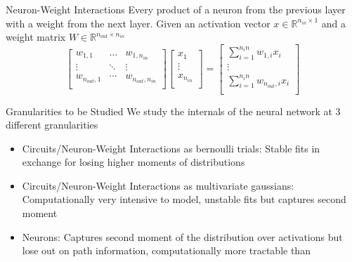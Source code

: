 \documentclass{beamer}
\begin{document}
    \begin{frame}{Neuron-Weight Interactions}
        Every product of a neuron from the previous layer with a weight from the next layer. 
        Given an activation vector $x \in \mathbb{R}^{n_{in} \times 1}$ and a weight matrix $W \in \mathbb{R}^{n_{out} \times n_{in}}$ 
        \[
            \begin{bmatrix}
                w_{1,1} & \dots & w_{1,n_{in}} \\
                \vdots & \ddots & \vdots \\
                w_{n_{out}, 1} & \cdots & w_{n_{out}, n_{in}} \\
            \end{bmatrix}
            \begin{bmatrix}
                x_1 \\
                \vdots \\
                x_{n_{in}} \\
            \end{bmatrix}
            = 
            \begin{bmatrix}
                \sum_{i=1}^{n_in} w_{1,i}x_i\\
                \vdots \\
                \sum_{i=1}^{n_in} w_{n_{out},i}x_i\\
            \end{bmatrix}
        \]
    \end{frame}

    \begin{frame}{Granularities to be Studied}
        We study the internals of the neural network at 3 different granularities
        \begin{itemize}
            \item 
                Circuits/Neuron-Weight Interactions as bernoulli trials: Stable fits in exchange for losing higher moments of distributions
            \item 
                Circuits/Neuron-Weight Interactions as multivariate gaussians: Computationally very intensive to model, unstable fits but captures second moment
            \item 
                Neurons: Captures second moment of the distribution over activations but lose out on path information, computationally more tractable than 
        \end{itemize}
    \end{frame}
    
\end{document}
